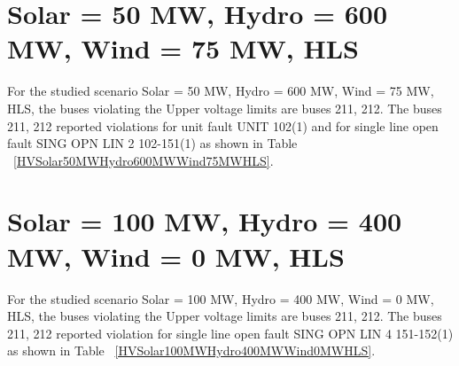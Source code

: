 \documentclass[10pt]{report}
\begin{document}
\section{Solar = 50 MW, Hydro = 600 MW, Wind = 75 MW, HLS}
For the studied scenario Solar = 50 MW, Hydro = 600 MW, Wind = 75 MW, HLS, the buses violating the Upper voltage limits are buses 211, 212.
The buses 211, 212 reported violations for unit fault UNIT 102(1) and for single line open fault SING OPN LIN   2 102-151(1) as shown in Table ~\ref{HVSolar50MWHydro600MWWind75MWHLS}.
\begin{table}[H]
\caption{Contingencies reporting bus voltages greater than emergency voltage of 1.1 PU for scenario Solar = 50 MW, Hydro = 600 MW, Wind = 75 MW, HLS}
\label{HVSolar50MWHydro600MWWind75MWHLS}
\centering
{}
\end{table}


\section{Solar = 100 MW, Hydro = 400 MW, Wind = 0 MW, HLS}
For the studied scenario Solar = 100 MW, Hydro = 400 MW, Wind = 0 MW, HLS, the buses violating the Upper voltage limits are buses 211, 212.
The buses 211, 212 reported violation for single line open fault SING OPN LIN   4 151-152(1) as shown in Table ~\ref{HVSolar100MWHydro400MWWind0MWHLS}.
\begin{table}[H]
\caption{Contingencies reporting bus voltages greater than emergency voltage of 1.1 PU for scenario Solar = 100 MW, Hydro = 400 MW, Wind = 0 MW, HLS}
\label{HVSolar100MWHydro400MWWind0MWHLS}
\centering
{}
\end{table}
\end{document}

